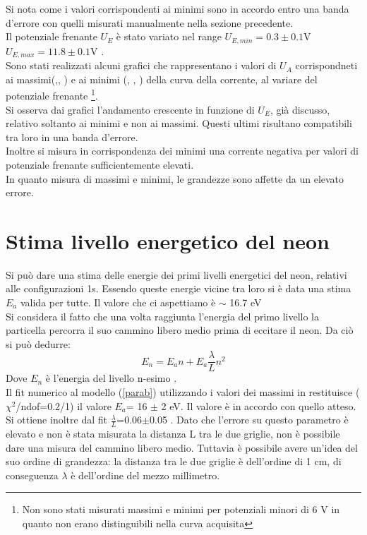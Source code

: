 Si nota come i valori corrispondenti ai minimi sono in accordo entro una banda d'errore con quelli misurati manualmente nella sezione precedente.\\
Il potenziale frenante $U_{E}$ è stato variato nel range $U_{E,min}=0.3\pm 0.1$V  $U_{E,max}=11.8 \pm 0.1$V . \\ 
Sono stati realizzati alcuni grafici che rappresentano i valori di $U_A$ corrispondneti ai massimi(,, ) e ai minimi (, , ) della curva della corrente, al variare del potenziale frenante \footnote{Non sono stati misurati massimi e minimi per potenziali minori di 6 V in quanto non erano distinguibili nella curva acquisita}.\\
Si osserva dai grafici l'andamento crescente in funzione di $U_E$, già discusso, relativo soltanto ai minimi e non ai massimi. Questi ultimi risultano compatibili tra loro in una banda d'errore.\\
Inoltre si misura in corrispondenza dei minimi una corrente negativa per valori di potenziale frenante sufficientemente elevati. \\
In quanto misura di massimi e minimi, le grandezze sono affette da un elevato errore.
\section{Stima livello energetico del neon}
Si può dare una stima delle energie dei primi livelli energetici del neon, relativi alle configurazioni 1s. Essendo queste energie vicine tra loro si è data una stima {$E_a$} valida per tutte. Il valore che ci aspettiamo è $\sim$ 16.7 eV\\
Si considera il fatto che una volta raggiunta l'energia del primo livello la particella percorra il suo cammino libero medio prima di eccitare il neon. Da ciò si può dedurre:
\begin{equation}
E_n= E_{a}n + E_{a}\frac{\lambda}{L}n^{2}
\label{parab}
\end{equation}
Dove {$E_n$} è l'energia del livello n-esimo .\\
Il fit numerico al modello (\ref{parab}) utilizzando i valori dei massimi in  restituisce ($\chi^2$/ndof=0.2/1) il valore $E_a$= 16 $\pm$ 2 eV. Il valore è in accordo con quello atteso.\\
Si ottiene inoltre dal fit $\frac{\lambda}{L}$=0.06$\pm$0.05 . Dato che l'errore su questo parametro è elevato e non è stata misurata la distanza L tra le due griglie, non è possibile dare una misura del cammino libero medio. Tuttavia è possibile avere un'idea del suo ordine di grandezza: la distanza tra le due griglie è dell'ordine di 1 cm, di conseguenza $\lambda$ è dell'ordine del mezzo millimetro. 

